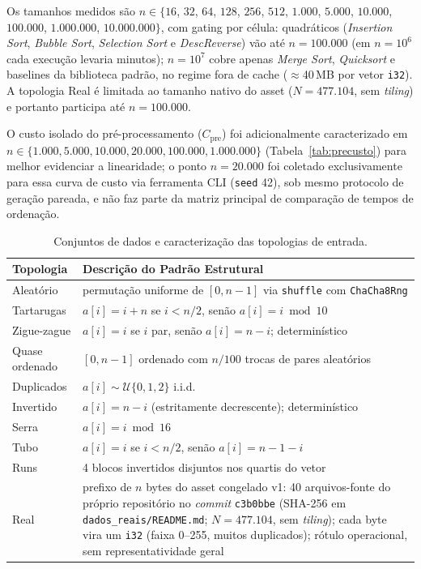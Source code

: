 \documentclass[portuguese]{sbc2025}%
\begin{document}
Os tamanhos medidos são $n \in \{16$, $32$, $64$, $128$, $256$, $512$, $1.000$, $5.000$, $10.000$, $100.000$, $1.000.000$, $10.000.000\}$, com gating por célula: quadráticos (\emph{Insertion Sort}, \emph{Bubble Sort}, \emph{Selection Sort} e \emph{DescReverse}) vão até $n{=}100.000$ (em $n{=}10^6$ cada execução levaria minutos); $n{=}10^7$ cobre apenas \emph{Merge Sort}, \emph{Quicksort} e baselines da biblioteca padrão, no regime fora de cache ($\approx$40\,MB por vetor \texttt{i32}). A topologia Real é limitada ao tamanho nativo do asset ($N{=}477.104$, sem \emph{tiling}) e portanto participa até $n{=}100.000$.

O custo isolado do pré-processamento ($C_{\text{pre}}$) foi adicionalmente caracterizado em $n \in \{1.000, 5.000, 10.000, 20.000, 100.000, 1.000.000\}$ (Tabela~\ref{tab:precusto}) para melhor evidenciar a linearidade; o ponto $n{=}20{.}000$ foi coletado exclusivamente para essa curva de custo via ferramenta CLI (\texttt{seed} 42), sob mesmo protocolo de geração pareada, e não faz parte da matriz principal de comparação de tempos de ordenação.

\begin{table}[htbp]
\centering
\caption{Conjuntos de dados e caracterização das topologias de entrada.}
\label{tab:datasets}
\small
\begin{tabularx}{\columnwidth}{@{}lX@{}}
\hline
\textbf{Topologia} & \textbf{Descrição do Padrão Estrutural} \\
\hline
Aleatório & permutação uniforme de $[0,n{-}1]$ via \texttt{shuffle} com \texttt{ChaCha8Rng} \\
Tartarugas & $a[i]=i+n$ se $i<n/2$, senão $a[i]=i \bmod 10$ \\
Zigue-zague & $a[i]=i$ se $i$ par, senão $a[i]=n-i$; determinístico \\
Quase ordenado & $[0,n{-}1]$ ordenado com $n/100$ trocas de pares aleatórios \\
Duplicados & $a[i]\sim\mathcal{U}\{0,1,2\}$ i.i.d. \\
Invertido & $a[i]=n-i$ (estritamente decrescente); determinístico \\
Serra & $a[i]=i \bmod 16$ \\
Tubo & $a[i]=i$ se $i<n/2$, senão $a[i]=n-1-i$ \\
Runs & 4 blocos invertidos disjuntos nos quartis do vetor \\
Real & prefixo de $n$ bytes do asset congelado v1: 40 arquivos-fonte do próprio repositório no \emph{commit} \texttt{c3b0bbe} (SHA-256 em \texttt{dados\_reais/README.md}; $N{=}477.104$, sem \emph{tiling}); cada byte vira um \texttt{i32} (faixa 0--255, muitos duplicados); rótulo operacional, sem representatividade geral \\
\hline
\end{tabularx}
\end{table}
\end{document}

